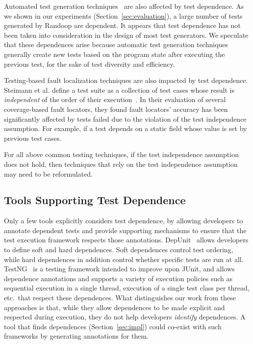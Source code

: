 Automated test generation techniques~\cite{PachecoLET2007, ZhangSBE2011} are also affected
by test dependence. As we shown in our experiments (Section~\ref{sec:evaluation}),
a large number of tests generated by Randoop are dependent.
It appears that test dependence has not been taken into
consideration in the design of most test generators.
We speculate that these dependences arise because automatic
test generation techniques generally create new tests
based on the program state after executing the previous test,
for the sake of test diversity and efficiency. 

Testing-based fault localization techniques are also impacted
by test dependence. Steimann et al. define a test suite as a
collection of test cases whose result is \textit{independent}
of the order of their execution~\cite{Steimann:2013}.
In their evaluation of several coverage-based fault locators, they found
fault locators' accuracy has been significantly affected
by tests failed due to the violation of the test independence assumption.
For example, if a test depends on a static field whose value is
set by previous test cases.  


For all above common testing techniques, if the test independence
assumption does not hold, then techniques that rely on
the test independence assumption may need to be reformulated.

\subsection{Tools Supporting Test Dependence}

Only a few tools explicitly considers test dependence, by
allowing developers to annotate dependent tests and
provide supporting mechanisms to ensure that the test execution framework
respects those annotations.  DepUnit~\cite{depunit}
allows developers to define soft and hard dependences. Soft dependences control
test ordering, while hard dependences in addition control whether specific tests are
run at all.  TestNG~\cite{testng} is a testing framework intended to improve upon JUnit,
and allows dependence annotations and supports a variety of execution policies such as sequential execution
in a single thread, execution of a single test class per thread, etc.\
that respect these dependences.
What distinguishes our work from these approaches is that, while they allow dependences
to be made explicit and respected during execution, they do not help developers
\emph{identify} dependences.  A tool that finds dependences
(Section~\ref{sec:impl}) could co-exist
with such frameworks by generating annotations for them.



